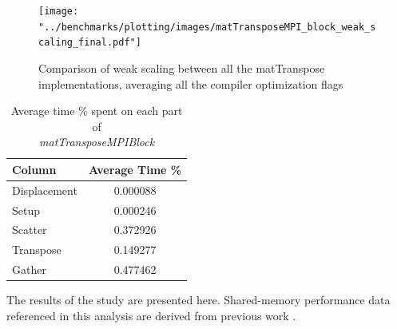 \documentclass[conference]{IEEEtran}
\begin{document}
\begin{figure}[htb]
	\centering
	\texttt{[image: "../benchmarks/plotting/images/matTransposeMPI\_block\_weak\_scaling\_final.pdf"]}
	\caption{Comparison of weak scaling between all the matTranspose implementations, averaging all the compiler optimization flags}
	\label{fig:transpose_mpi_block_weak_scaling_final}
\end{figure}


\begin{table}[h!]
\centering
\caption{Average time \% spent on each part of \\
\textit{matTransposeMPIBlock}}
\label{tab:normalized_averages}
\begin{tabular}{lc}
\toprule
\textbf{Column} & \textbf{Average Time \%} \\
\midrule
Displacement    & 0.000088 \\
Setup           & 0.000246 \\
Scatter         & 0.372926 \\
Transpose       & 0.149277 \\
Gather          & 0.477462 \\
\midrule
\end{tabular}
\end{table}

The results of the study are presented here. Shared-memory performance
data referenced in this analysis are derived from previous work \cite{b10}.
\end{document}
